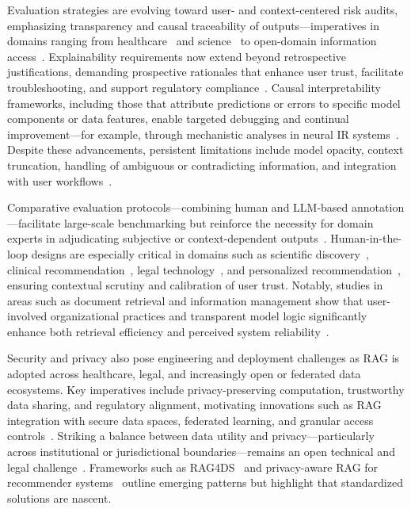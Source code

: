 \documentclass[sigconf]{acmart}
\begin{document}
Evaluation strategies are evolving toward user- and context-centered risk audits, emphasizing transparency and causal traceability of outputs---imperatives in domains ranging from healthcare~\cite{ref2,ref3,ref5,ref8,ref10,ref13,ref17,ref22,ref23,ref25,ref26,ref27,ref29,ref30,ref32,ref33,ref34,ref36,ref39,ref40,ref41,ref48,ref52,ref53,ref54,ref55,ref63,ref64} and science~\cite{ref29,ref30} to open-domain information access~\cite{ref40,ref39,ref41}. Explainability requirements now extend beyond retrospective justifications, demanding prospective rationales that enhance user trust, facilitate troubleshooting, and support regulatory compliance~\cite{ref32,ref33,ref34,ref36,ref39,ref40,ref41,ref52,ref54,ref55,ref63,ref64}. Causal interpretability frameworks, including those that attribute predictions or errors to specific model components or data features, enable targeted debugging and continual improvement---for example, through mechanistic analyses in neural IR systems~\cite{ref27,ref30,ref39,ref48,ref54,ref55,ref63,ref64}. Despite these advancements, persistent limitations include model opacity, context truncation, handling of ambiguous or contradicting information, and integration with user workflows~\cite{ref3,ref5,ref10,ref39,ref40,ref41,ref50,ref51,ref53,ref54,ref55}.

Comparative evaluation protocols---combining human and LLM-based annotation---facilitate large-scale benchmarking but reinforce the necessity for domain experts in adjudicating subjective or context-dependent outputs~\cite{ref39,ref40,ref41,ref50,ref51,ref53,ref54,ref55}. Human-in-the-loop designs are especially critical in domains such as scientific discovery~\cite{ref30}, clinical recommendation~\cite{ref2,ref5,ref53,ref55}, legal technology~\cite{ref63}, and personalized recommendation~\cite{ref32,ref33,ref34,ref36}, ensuring contextual scrutiny and calibration of user trust. Notably, studies in areas such as document retrieval and information management show that user-involved organizational practices and transparent model logic significantly enhance both retrieval efficiency and perceived system reliability~\cite{ref39,ref40,ref41}.

Security and privacy also pose engineering and deployment challenges as RAG is adopted across healthcare, legal, and increasingly open or federated data ecosystems. Key imperatives include privacy-preserving computation, trustworthy data sharing, and regulatory alignment, motivating innovations such as RAG integration with secure data spaces, federated learning, and granular access controls~\cite{ref63,ref64}. Striking a balance between data utility and privacy---particularly across institutional or jurisdictional boundaries---remains an open technical and legal challenge~\cite{ref63,ref64}. Frameworks such as RAG4DS~\cite{ref64} and privacy-aware RAG for recommender systems~\cite{ref32,ref33,ref36} outline emerging patterns but highlight that standardized solutions are nascent.
\end{document}
